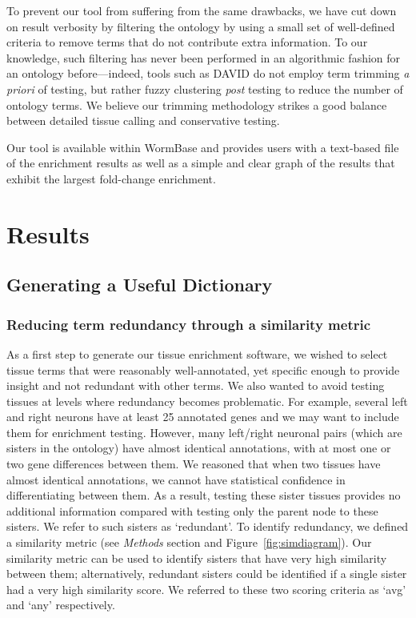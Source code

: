 \documentclass[linenumbers, doublespacing]{bmcart}
\begin{document}
	To prevent our tool from suffering from the same drawbacks, we have cut down on result verbosity by filtering the ontology by using a small set of well-defined criteria to remove terms that do not contribute extra information. To our knowledge, such filtering has never been performed in an algorithmic fashion for an ontology before---indeed, tools such as DAVID do not employ term trimming \emph{a priori} of testing, but rather fuzzy clustering \emph{post} testing to reduce the number of ontology terms. We believe our trimming methodology strikes a good balance between detailed tissue calling and conservative testing.	

	Our tool is available within WormBase and provides users with a text-based file of the enrichment results as well as a simple and clear graph of the results that exhibit the largest fold-change enrichment.

\section*{Results}
\subsection*{Generating a Useful Dictionary}
\subsubsection*{Reducing term redundancy through a similarity metric}
As a first step to generate our tissue enrichment software, we wished to select tissue terms that were reasonably well-annotated, yet specific enough to provide insight and not redundant with other terms. We also wanted to avoid testing tissues at levels where redundancy becomes problematic. For example, several left and right neurons have at least 25 annotated genes and we may want to include them for enrichment testing. However, many left/right neuronal pairs (which are sisters in the ontology) have almost identical annotations, with at most one or two gene differences between them. We reasoned that when two tissues have almost identical annotations, we cannot have statistical confidence in differentiating between them. As a result, testing these sister tissues provides no additional information compared with testing only the parent node to these sisters. We refer to such sisters as `redundant'. To identify redundancy, we defined a similarity metric (see \emph{Methods} section and Figure~\ref{fig:simdiagram}). Our similarity metric can be used to identify sisters that have very high similarity between them; alternatively, redundant sisters could be identified if a single sister had a very high similarity score. We referred to these two scoring criteria as `avg' and `any' respectively. 
\end{document}
